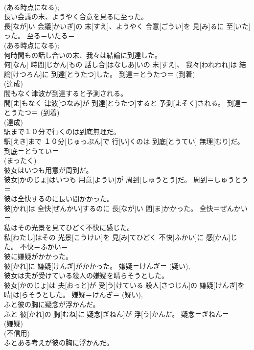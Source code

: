 \documentclass[8pt]{extreport}
\begin{document}
\begin{CJK}{UTF8}{min}
{\\	(ある時点になる); 
\\	長い会議の末、ようやく合意を見るに至った。	
\\	長[なが]い 会議[かいぎ]の 末[すえ]、ようやく 合意[ごうい]を 見[み]るに 至[いた]った。	至る＝いたる＝ 
\\	(ある時点になる); 
\\	何時間もの話し合いの末、我々は結論に到達した。	
\\	何[なん] 時間[じかん]もの 話し合[はなしあ]いの 末[すえ]、 我々[われわれ]は 結論[けつろん]に 到達[とうたつ]した。	到達＝とうたつ＝ (到着) 
\\	(達成) 
\\	間もなく津波が到達すると予測される。	
\\	間[ま]もなく 津波[つなみ]が 到達[とうたつ]すると 予測[よそく]される。	到達＝とうたつ＝ (到着) 
\\	(達成) 
\\	駅まで１０分で行くのは到底無理だ。	
\\	駅[えき]まで １０分[じゅっぷん]で 行[い]くのは 到底[とうてい] 無理[むり]だ。	到底＝とうてい＝ 
\\	(まったく) 
\\	彼女はいつも用意が周到だ。	
\\	彼女[かのじょ]はいつも 用意[ようい]が 周到[しゅうとう]だ。	周到＝しゅうとう＝ 
\\	彼は全快するのに長い間かかった。	
\\	彼[かれ]は 全快[ぜんかい]するのに 長[なが]い 間[ま]かかった。	全快＝ぜんかい＝ 
\\	私はその光景を見てひどく不快に感じた。	
\\	私[わたし]はその 光景[こうけい]を 見[み]てひどく 不快[ふかい]に 感[かん]じた。	不快＝ふかい＝ 
\\	彼に嫌疑がかかった。	
\\	彼[かれ]に 嫌疑[けんぎ]がかかった。	嫌疑＝けんぎ＝ (疑い), 
\\	彼女は夫が受けている殺人の嫌疑を晴らそうとした。	
\\	彼女[かのじょ]は 夫[おっと]が 受[う]けている 殺人[さつじん]の 嫌疑[けんぎ]を 晴[は]らそうとした。	嫌疑＝けんぎ＝ (疑い), 
\\	ふと彼の胸に疑念が浮かんだ。	
\\	ふと 彼[かれ]の 胸[むね]に 疑念[ぎねん]が 浮[う]かんだ。	疑念＝ぎねん＝ 
\\	(嫌疑) 
\\	(不信用) 
\\	ふとある考えが彼の胸に浮かんだ。	
}
\end{CJK}
\end{document}
